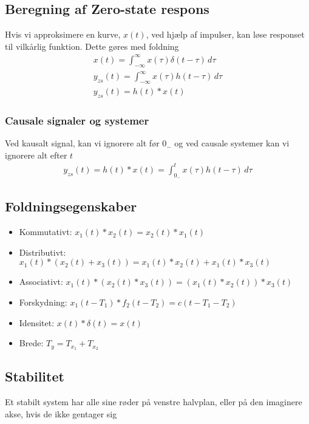 \subsection{Beregning af Zero-state respons}
	Hvis vi approksimere en kurve, $x(t)$, ved hjælp af impulser, kan løse responset til vilkårlig funktion. Dette gøres med foldning
	\begin{align}
		x(t)=\int_{-\infty}^{\infty}x(\tau)\delta(t-\tau)\,d\tau\\
		y_{zs}(t)=\int_{-\infty}^{\infty}x(\tau)h(t-\tau)\,d\tau\\
		y_{zs}(t)=h(t)*x(t)
	\end{align}

	\subsubsection{Causale signaler og systemer}
		Ved kausalt signal, kan vi ignorere alt før $0_-$ og ved causale systemer kan vi ignorere alt efter $t$
		\begin{align}
			y_{zs}(t)=h(t)*x(t)=\int_{0_-}^{t}x(\tau)h(t-\tau)\,d\tau
		\end{align}

\subsection{Foldningsegenskaber}
	\begin{itemize}
		\item Kommutativt: $x_1(t)*x_2(t)=x_2(t)*x_1(t)$
		\item Distributivt: $x_1(t)*(x_2(t)+x_3(t))=x_1(t)*x_2(t)+x_1(t)*x_3(t)$
		\item Associativt: $x_1(t)*(x_2(t)*x_3(t))=(x_1(t)*x_2(t))*x_3(t)$
		\item Forskydning: $x_1(t-T_1)*f_2(t-T_2)=c(t-T_1-T_2)$
		\item Idensitet: $x(t)*\delta(t)=x(t)$
		\item Brede: $T_y=T_{x_1}+T_{x_2}$
	\end{itemize}

\subsection{Stabilitet}
	Et stabilt system har alle sine røder på venstre halvplan, eller på den imaginere akse, hvis de ikke gentager sig
